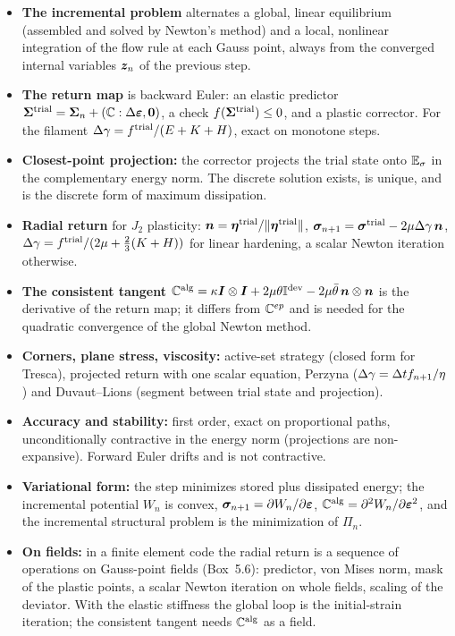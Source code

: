 \begin{gbox*}
\begin{itemize}
  \item \textbf{The incremental problem} alternates a global, linear
  equilibrium (assembled and solved by Newton's method) and a local, nonlinear
  integration of the flow rule at each Gauss point, always from the converged
  internal variables $\bm{z}_n$ of the previous step.
  \item \textbf{The return map} is backward Euler: an elastic predictor
  $\bm{\Sigma}^{\mathrm{trial}}=\bm{\Sigma}_n+(\mathbb{C}:\Delta\bm{\varepsilon},\bm{0})$, a check
  $f(\bm{\Sigma}^{\mathrm{trial}})\le0$, and a plastic corrector. For the filament
  $\Delta\gamma=f^{\mathrm{trial}}/(E+K+H)$, exact on monotone steps.
  \item \textbf{Closest-point projection:} the corrector projects the trial
  state onto $\mathbb{E}_{\sigma}$ in the complementary energy norm. The discrete solution
  exists, is unique, and is the discrete form of maximum dissipation.
  \item \textbf{Radial return} for $J_2$ plasticity:
  $\bm{n}=\bm{\eta}^{\mathrm{trial}}/\lVert \bm{\eta}^{\mathrm{trial}}\rVert$, $\bm{\sigma}_{n+1}=\bm{\sigma}^{\mathrm{trial}}-2\mu\Delta\gamma\,\bm{n}$,
  $\Delta\gamma=f^{\mathrm{trial}}/(2\mu+\tfrac23(K+H))$ for linear hardening, a scalar Newton
  iteration otherwise.
  \item \textbf{The consistent tangent}
  $\mathbb{C}^{\mathrm{alg}}=\kappa\bm{I}\otimes\bm{I}+2\mu\theta\mathbb{I}^{\mathrm{dev}}-2\mu\bar\theta\,\bm{n}\otimes\bm{n}$
  is the derivative of the return map; it differs from $\mathbb{C}^{ep}$ and is needed
  for the quadratic convergence of the global Newton method.
  \item \textbf{Corners, plane stress, viscosity:} active-set strategy (closed
  form for Tresca), projected return with one scalar equation, Perzyna
  ($\Delta\gamma=\Delta t f_{n+1}/\eta$) and Duvaut--Lions (segment between trial state
  and projection).
  \item \textbf{Accuracy and stability:} first order, exact on proportional
  paths, unconditionally contractive in the energy norm (projections are
  non-expansive). Forward Euler drifts and is not contractive.
  \item \textbf{Variational form:} the step minimizes stored plus dissipated
  energy; the incremental potential $W_n$ is convex, $\bm{\sigma}_{n+1}=\partial W_n/\partial\bm{\varepsilon}$,
  $\mathbb{C}^{\mathrm{alg}}=\partial^2W_n/\partial\bm{\varepsilon}^2$, and the incremental structural
  problem is the minimization of $\Pi_n$.
  \item \textbf{On fields:} in a finite element code the radial return is a
  sequence of operations on Gauss-point fields (Box~5.6): predictor, von Mises
  norm, mask of the plastic points, a scalar Newton iteration on whole fields,
  scaling of the deviator. With the elastic stiffness the global loop is the
  initial-strain iteration; the consistent tangent needs $\mathbb{C}^{\mathrm{alg}}$ as a field.
\end{itemize}
\end{gbox*}


